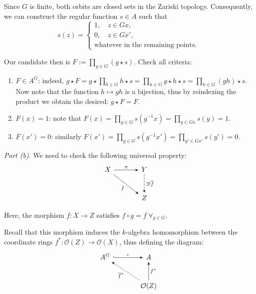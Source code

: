 \documentclass{template}
\begin{document}
Since $G$ is finite, both orbits are closed sets in the Zariski topology.
Consequently, we can construct the regular function $s \in A$ such that
\begin{equation*}
    s(z) = \begin{cases}
        1, \quad z \in Gx, \\
        0, \quad z \in Gx', \\
        \text{whatever in the remaining points}.
    \end{cases}
\end{equation*}

Our candidate then is $F := \prod_{g \in G} (g \star s)$. Check all criteria:
\begin{enumerate}
    \item \underline{$F \in A^G$}: indeed, $g \star F = g \star \prod_{h \in G}
    h \star s = \prod_{h \in G}g \star h \star s = \prod_{h \in G} (gh) \star
    s$. Now note that the function $h \mapsto gh$ is a bijection, thus by
    reindexing the product we obtain the desired: $g \star F = F$.
    \item \underline{$F(x)=1$}: note that $F(x) = \prod_{g \in G} s(g^{-1}x) =
    \prod_{y \in Gx}s(y) = 1$.
    \item \underline{$F(x')=0$}: similarly $F(x') = \prod_{g \in G}s(g^{-1}x') =
    \prod_{y' \in Gx'}s(y') = 0$.
\end{enumerate}

\textcolor{blue!70!black}{\textit{Part (b).}} We need to check the following
universal property:
\[
\begin{tikzcd}[row sep=large, column sep=large]
    X \arrow[-Stealth]{r}{\pi} 
    \arrow[-Stealth]{rd}[swap]{f} & Y \arrow[-Stealth, dashed]{d}{\exists! \overline{f}}  \\
    & Z 
\end{tikzcd}
\]

Here, the morphism $f: X \to Z$ satisfies $f \circ g = f \; \forall_{g \in G}$.

Recall that this morphism induces the $k$-algebra homomorphism between the
coordinate rings $f^*: \mathcal{O}(Z) \to \mathcal{O}(X)$, thus defining the diagram:
\[
\begin{tikzcd}[row sep=large, column sep=large]
    A^G \arrow[-Stealth, hook]{r}{\iota} & A \\
    & \mathcal{O}(Z) \arrow[-Stealth]{u}[swap]{f^*}
    \arrow[-Stealth, dashed]{lu}{\overline{f}^*}
\end{tikzcd}
\]
\end{document}
